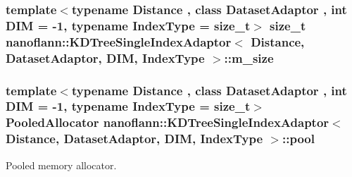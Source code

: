 \hypertarget{classnanoflann_1_1_k_d_tree_single_index_adaptor_ae3fb51b45d175da41f23e881fffc40da}{
\subsubsection[{m\-\_\-size}]{\setlength{\rightskip}{0pt plus 5cm}template$<$typename Distance , class Dataset\-Adaptor , int D\-I\-M = -\/1, typename Index\-Type  = size\-\_\-t$>$ size\-\_\-t {\bf nanoflann\-::\-K\-D\-Tree\-Single\-Index\-Adaptor}$<$ Distance, Dataset\-Adaptor, D\-I\-M, Index\-Type $>$\-::m\-\_\-size\hspace{0.3cm}{\ttfamily [protected]}}}\label{classnanoflann_1_1_k_d_tree_single_index_adaptor_ae3fb51b45d175da41f23e881fffc40da}
\hypertarget{classnanoflann_1_1_k_d_tree_single_index_adaptor_ae8ccbdf98502c57ccc4206de59ed28e1}{
\subsubsection[{pool}]{\setlength{\rightskip}{0pt plus 5cm}template$<$typename Distance , class Dataset\-Adaptor , int D\-I\-M = -\/1, typename Index\-Type  = size\-\_\-t$>$ {\bf Pooled\-Allocator} {\bf nanoflann\-::\-K\-D\-Tree\-Single\-Index\-Adaptor}$<$ Distance, Dataset\-Adaptor, D\-I\-M, Index\-Type $>$\-::pool\hspace{0.3cm}{\ttfamily [protected]}}}\label{classnanoflann_1_1_k_d_tree_single_index_adaptor_ae8ccbdf98502c57ccc4206de59ed28e1}
Pooled memory allocator.

